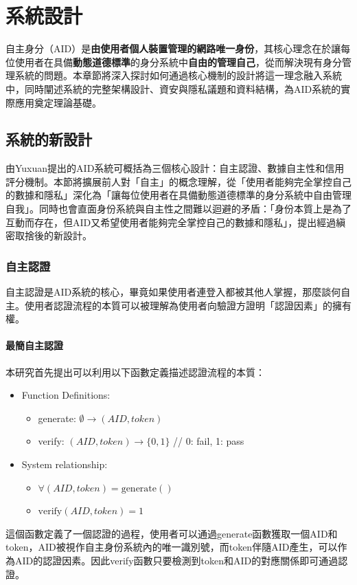 
\chapter{系統設計}
自主身分（AID）是\textbf{由使用者個人裝置管理的網路唯一身份}，其核心理念在於讓每位使用者在具備\textbf{動態道德標準}的身分系統中\textbf{自由的管理自己}，從而解決現有身分管理系統的問題。本章節將深入探討如何通過核心機制的設計將這一理念融入系統中，同時闡述系統的完整架構設計、資安與隱私議題和資料結構，為AID系統的實際應用奠定理論基礎。
\section{系統的新設計}
由Yuxuan\cite{ntu-lin2014autonomous}提出的AID系統可概括為三個核心設計：自主認證、數據自主性和信用評分機制。本節將擴展前人對「自主」的概念理解，從「使用者能夠完全掌控自己的數據和隱私」深化為「讓每位使用者在具備動態道德標準的身分系統中自由管理自我」。同時也會直面身份系統與自主性之間難以迴避的矛盾：「身份本質上是為了互動而存在，但AID又希望使用者能夠完全掌控自己的數據和隱私」，提出經過縝密取捨後的新設計。
\subsection{自主認證}
自主認證是AID系統的核心，畢竟如果使用者連登入都被其他人掌握，那麼談何自主。使用者認證流程的本質可以被理解為使用者向驗證方證明「認證因素」\cite{AlQahtani2021AF}的擁有權。
\subsubsection{最簡自主認證}
本研究首先提出可以利用以下函數定義描述認證流程的本質：
\begin{itemize}
  \item Function Definitions:
        \begin{itemize}
          \item generate: $\emptyset \rightarrow (AID, token)$
          \item verify: $(AID, token) \rightarrow \{0,1\}$ \hfill // 0: fail, 1: pass
        \end{itemize}
  \item System relationship:
        \begin{itemize}
          \item $\forall(AID, token) = \text{generate}()$
          \item $\text{verify}(AID, token) = 1$
        \end{itemize}
\end{itemize}
這個函數定義了一個認證的過程，使用者可以通過generate函數獲取一個AID和token，AID被視作自主身份系統內的唯一識別號，而token伴隨AID產生，可以作為AID的認證因素。因此verify函數只要檢測到token和AID的對應關係即可通過認證。

